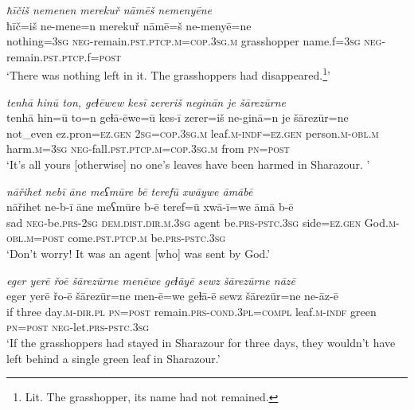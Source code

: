 \ea \label{PM.26}
\textit{ħīčiš nemenen merekuř nāmēš nemenyēne} \\ 
\gll ħīč=iš ne-mene=n merekuř nāmē=š ne-menyē=ne \\ 
 nothing\textsc{=3sg} \textsc{neg-}remain\textsc{.pst}\textsc{.ptcp}\textsc{.m}\textsc{=cop}\textsc{.3sg}\textsc{.m} grasshopper name.f\textsc{=3sg} \textsc{neg-}remain\textsc{.pst}\textsc{.ptcp}.f\textsc{=\textsc{post}} \\ 
\glt `There was nothing left in it. The grasshoppers had disappeared.\footnote{Lit. The grasshopper, its name had not remained.}'
\z 
 
\ea \label{PM.31}
\textit{tenhā hinū ton, geɫēwew kesī zereriš neginān je šārezūrne} \\ 
\gll tenhā hin=ū to=n geɫā-ēwe=ū kes-ī zerer=iš ne-ginā=n je šārezūr=ne \\ 
 not\_even ez.pron\textsc{\textsc{=ez.gen}} \textsc{2sg}\textsc{=cop}\textsc{.3sg}\textsc{.m} leaf\textsc{.m}\textsc{-indf}\textsc{\textsc{=ez.gen}} person\textsc{.m}\textsc{-obl}\textsc{.m} harm\textsc{.m}\textsc{=3sg} \textsc{neg-}fall\textsc{.pst}\textsc{.ptcp}\textsc{.m}\textsc{=cop}\textsc{.3sg}\textsc{.m} from \textsc{pn}\textsc{=\textsc{post}} \\ 
\glt `It’s all yours [otherwise] no one’s leaves have been harmed in Sharazour. '
\z 
 
\ea \label{PM.34}
\textit{nāřihet nebī āne meʕmūre bē terefū xwāywe āmābē} \\ 
\gll nāřihet ne-b-ī āne meʕmūre b-ē teref=ū xwā-ī=we āmā b-ē \\ 
 sad \textsc{neg-}be\textsc{.prs}-\textsc{2sg} \textsc{dem.dist}\textsc{.dir}\textsc{.m}\textsc{.3sg} agent be\textsc{.prs}\textsc{-pstc}\textsc{.3sg} side\textsc{\textsc{=ez.gen}} God\textsc{.m}\textsc{-obl}\textsc{.m}\textsc{=\textsc{post}} come\textsc{.pst}\textsc{.ptcp}\textsc{.m} be\textsc{.prs}\textsc{-pstc}\textsc{.3sg} \\ 
\glt `Don’t worry! It was an agent [who] was sent  by God.'
\z 
 
\ea \label{PM.35}
\textit{eger yerē řoē šārezūrne menēwe geɫāyē sewz šārezūrne nāzē} \\ 
\gll eger yerē řo-ē šārezūr=ne men-ē=we geɫā-ē sewz šārezūr=ne ne-āz-ē \\ 
 if three day\textsc{.m}\textsc{-dir}\textsc{.pl} \textsc{pn}\textsc{=\textsc{post}} remain\textsc{.prs}\textsc{-cond}\textsc{.3pl}\textsc{=compl} leaf\textsc{.m}\textsc{-indf} green \textsc{pn}\textsc{=\textsc{post}} \textsc{neg-}let\textsc{.prs}\textsc{-pstc}\textsc{.3sg} \\ 
\glt `If the grasshoppers had stayed in Sharazour for three days, they wouldn’t have left behind a single green leaf in Sharazour.'
\z 
 

